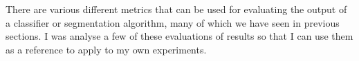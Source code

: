 There are various different metrics that can be used for evaluating the output
of a classifier or segmentation algorithm, many of which we have seen in previous
sections. I was analyse a few of these evaluations of results so that I can use
them as a reference to apply to my own experiments.

\subsection{}

\subsection{}

\subsection{}
